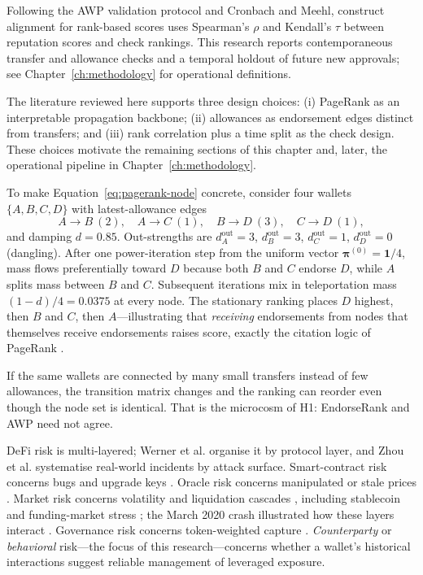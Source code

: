 Following the AWP validation protocol and Cronbach and Meehl, construct alignment for rank-based scores uses Spearman's $\rho$ and Kendall's $\tau$ between reputation scores and check rankings. This research reports contemporaneous transfer and allowance checks and a temporal holdout of future new approvals; see Chapter~\ref{ch:methodology} for operational definitions.

The literature reviewed here supports three design choices: (i) PageRank as an interpretable propagation backbone; (ii) allowances as endorsement edges distinct from transfers; and (iii) rank correlation plus a time split as the check design. These choices motivate the remaining sections of this chapter and, later, the operational pipeline in Chapter~\ref{ch:methodology}.


To make Equation~\eqref{eq:pagerank-node} concrete, consider four wallets $\{A,B,C,D\}$ with latest-allowance edges
\[
A\to B\ (2),\quad A\to C\ (1),\quad B\to D\ (3),\quad C\to D\ (1),
\]
and damping $d=0.85$. Out-strengths are $d_A^{\mathrm{out}}=3$, $d_B^{\mathrm{out}}=3$, $d_C^{\mathrm{out}}=1$, $d_D^{\mathrm{out}}=0$ (dangling). After one power-iteration step from the uniform vector $\boldsymbol{\pi}^{(0)}=\mathbf{1}/4$, mass flows preferentially toward $D$ because both $B$ and $C$ endorse $D$, while $A$ splits mass between $B$ and $C$. Subsequent iterations mix in teleportation mass $(1-d)/4=0.0375$ at every node. The stationary ranking places $D$ highest, then $B$ and $C$, then $A$---illustrating that \emph{receiving} endorsements from nodes that themselves receive endorsements raises score, exactly the citation logic of PageRank .

If the same wallets are connected by many small transfers instead of few allowances, the transition matrix changes and the ranking can reorder even though the node set is identical. That is the microcosm of H1: EndorseRank and AWP need not agree.


DeFi risk is multi-layered; Werner et al. organise it by protocol layer, and Zhou et al. systematise real-world incidents by attack surface. Smart-contract risk concerns bugs and upgrade keys . Oracle risk concerns manipulated or stale prices . Market risk concerns volatility and liquidation cascades , including stablecoin and funding-market stress ; the March 2020 crash illustrated how these layers interact . Governance risk concerns token-weighted capture . \emph{Counterparty} or \emph{behavioral} risk---the focus of this research---concerns whether a wallet's historical interactions suggest reliable management of leveraged exposure.

